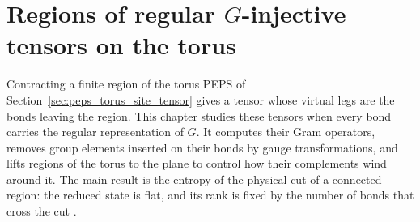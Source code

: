 
\chapter{Regions of regular \texorpdfstring{$G$}{G}-injective tensors on the torus}%
\label{ch:peps_g_injective_regions}

Contracting a finite region of the torus PEPS of
Section~\ref{sec:peps_torus_site_tensor} gives a tensor whose virtual legs are
the bonds leaving the region. This chapter studies these tensors when every
bond carries the regular representation of $G$. It computes their Gram
operators, removes group elements inserted on their bonds by gauge
transformations, and lifts regions of the torus to the plane to control how
their complements wind around it. The main result is the entropy of the
physical cut of a connected region: the reduced state is flat, and its rank is
fixed by the number of bonds that cross the cut \cite{Schuch2010PEPS}.











